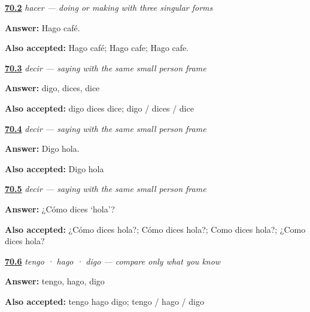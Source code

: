 \noindent\begin{minipage}[t]{\linewidth}
\raggedright
\hyperlink{review-ES-C12-hacer-make-coffee}{\textbf{70.2}} \emph{hacer — doing or making with three singular forms}\par
\small \textbf{Answer:} Hago café.\par
\footnotesize \textbf{Also accepted:} Hago café; Hago cafe; Hago cafe.
\end{minipage}\par\medskip

\noindent\begin{minipage}[t]{\linewidth}
\raggedright
\hyperlink{review-ES-C12-decir-singular-forms}{\textbf{70.3}} \emph{decir — saying with the same small person frame}\par
\small \textbf{Answer:} digo, dices, dice\par
\footnotesize \textbf{Also accepted:} digo dices dice; digo / dices / dice
\end{minipage}\par\medskip

\noindent\begin{minipage}[t]{\linewidth}
\raggedright
\hyperlink{review-ES-C12-decir-say-hello}{\textbf{70.4}} \emph{decir — saying with the same small person frame}\par
\small \textbf{Answer:} Digo hola.\par
\footnotesize \textbf{Also accepted:} Digo hola
\end{minipage}\par\medskip

\noindent\begin{minipage}[t]{\linewidth}
\raggedright
\hyperlink{review-ES-C12-decir-how-do-you-say}{\textbf{70.5}} \emph{decir — saying with the same small person frame}\par
\small \textbf{Answer:} ¿Cómo dices ‘hola’?\par
\footnotesize \textbf{Also accepted:} ¿Cómo dices hola?; Cómo dices hola?; Como dices hola?; ¿Como dices hola?
\end{minipage}\par\medskip

\noindent\begin{minipage}[t]{\linewidth}
\raggedright
\hyperlink{review-ES-C12-yo-go-learned-order}{\textbf{70.6}} \emph{tengo · hago · digo — compare only what you know}\par
\small \textbf{Answer:} tengo, hago, digo\par
\footnotesize \textbf{Also accepted:} tengo hago digo; tengo / hago / digo
\end{minipage}\par\medskip

